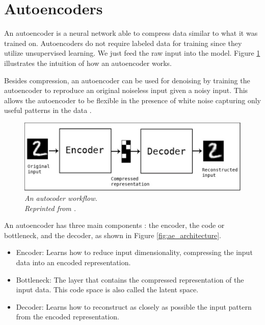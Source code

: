 \section{Autoencoders}

An autoencoder is a neural network able to compress data similar to what it was trained on. Autoencoders do not require labeled data for training since they utilize unsupervised learning. We just feed the raw input into the model. Figure \ref{fig:ae} illustrates the intuition of how an autoencoder works.


Besides compression, an autoencoder can be used for denoising by training the autoencoder to reproduce an original noiseless input given a noisy input. This allows the autoencoder to be flexible in the presence of white noise capturing only useful patterns in the data \cite{vincent10a}.

\begin{figure}[H]
  \centering
  \caption[An autocoder workflow.]{\emph{An autocoder workflow. \\
      Reprinted from \citeauthor{chollet_2016} \citeyear{chollet_2016}.}}\label{fig:ae}
  \includegraphics[scale = 0.5]{figures/ae.jpg}
\end{figure}


An autoencoder has three main components \cite{badr_2019}: the encoder, the code or bottleneck, and the decoder, as shown in Figure \ref{fig:ae_architecture}.
\begin{itemize}
  \item Encoder: Learns how to reduce input dimensionality, compressing the input data into an encoded representation.
  \item Bottleneck: The layer that contains the compressed representation of the input data. This code space is also called the latent space.
  \item Decoder: Learns how to reconstruct as closely as possible the input pattern from the encoded representation.
\end{itemize}

